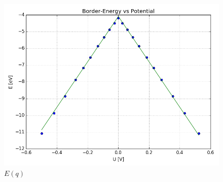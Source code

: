 \begin{figure}[]
	\centering
	\includegraphics[width = 12cm]{Images/Hydrogen/hydrogen_border_energy}
	\caption{$E(q)$}
	\label{image_hydrogen_energy_potential}
\end{figure}

